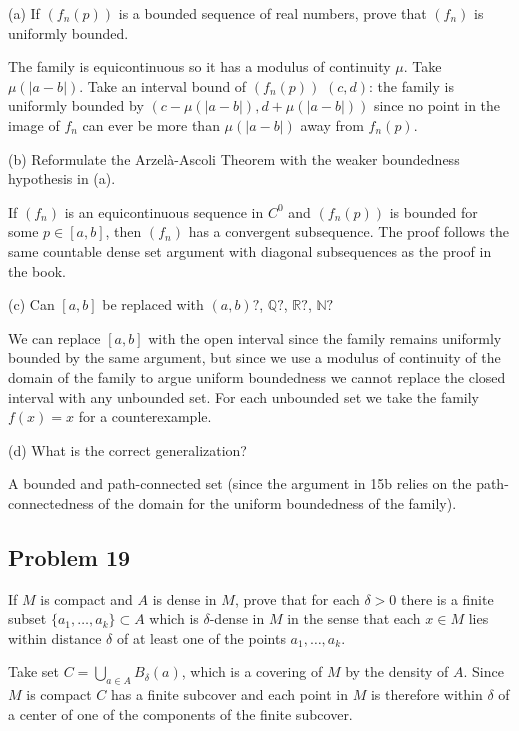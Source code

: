 \documentclass{amsart}
\begin{document}
(a) If \( (f_n(p)) \) is a bounded sequence of real numbers, prove that \( (f_n) \) is uniformly bounded.

\medskip \noindent The family is equicontinuous so it has a modulus of continuity $\mu$. Take $\mu(|a-b|)$. Take an interval bound of $(f_n(p))$ 
$(c, d)$: the family is uniformly bounded by $(c-\mu(|a-b|), d+\mu(|a-b|))$ since no point in the image of $f_n$ can ever 
be more than $\mu(|a-b|)$ away from $f_n(p)$. 
\bigskip

(b) Reformulate the Arzelà-Ascoli Theorem with the weaker boundedness hypothesis in (a).

\medskip \noindent If $(f_n)$ is an equicontinuous sequence in $C^0$ and $(f_n(p))$ is bounded for some $p\in [a,b]$,
then $(f_n)$ has a convergent subsequence. The proof follows the same countable dense set argument with diagonal subsequences
as the proof in the book.

\bigskip

(c) Can \( [a, b] \) be replaced with \( (a, b)? \), \( \mathbb{Q}? \), \( \mathbb{R}? \), \( \mathbb{N}? \)

\medskip \noindent We can replace $[a, b]$ with the open interval since the family remains uniformly bounded by the same argument, but
since we use a modulus of continuity of the domain of the family to argue uniform boundedness we cannot replace the 
closed interval with any unbounded set. For each unbounded set we take the family ${f(x)=x}$ for a counterexample. 

\bigskip

(d) What is the correct generalization?

\medskip \noindent A bounded and path-connected set (since the argument in 15b relies on the path-connectedness of the domain for the 
uniform boundedness of the family).

\newpage

\subsection*{Problem 19} If \( M \) is compact and \( A \) is dense in \( M \), prove that for each \( \delta > 0 \) there is a finite subset \( \{a_1, \ldots, a_k\} \subset A \) which is \( \delta \)-dense in \( M \) in the sense that each \( x \in M \) lies within distance \( \delta \) of at least one of the points \( a_1, \ldots, a_k \).

\medskip \noindent Take set $C = \bigcup_{a\in A} B_{\delta}(a)$, which is a covering of $M$ by the density of $A$. Since $M$ is compact 
$C$ has a finite subcover and each point in $M$ is therefore within $\delta$ of a center of one of the components of the finite subcover.
\end{document}
